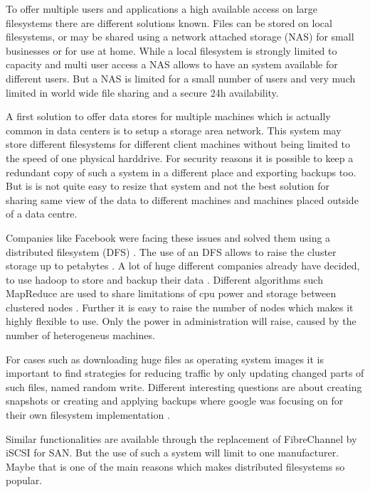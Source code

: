 To offer multiple users and applications a high available access on large filesystems there are different solutions known. 
Files can be stored on local filesystems, or may be shared using a network attached storage (NAS) for small businesses or for use at home. 
While a local filesystem is strongly limited to capacity and multi user access a NAS allows to have an system available for different users. 
But a NAS is limited for a small number of users and very much limited in world wide file sharing and a secure 24h availability.

A first solution to offer data stores for multiple machines which is actually common in data centers is to setup a storage area network. 
This system may store different filesystems for different client machines without being limited to the speed of one physical harddrive. 
For security reasons it is possible to keep a redundant copy of such a system in a different place and exporting backups too. 
But is is not quite easy to resize that system and not the best solution for sharing same view of the data to different machines and machines placed outside of a data centre.

Companies like Facebook were facing these issues and solved them using a distributed filesystem (DFS) \cite{fb-hadoop}. 
The use of an DFS allows to raise the cluster storage  up to petabytes  \cite{fb-hadoop}. 
A lot of huge different companies already have decided, to use hadoop to store and backup their data  \cite{hadoop-poweredby}. 
Different algorithms such MapReduce are used to share limitations of cpu power and storage between clustered nodes \cite{dean2008mapreduce}. 
Further it is easy to raise the number of nodes which makes it highly flexible to use. Only the power in administration will raise, caused by the number of heterogeneus machines.

For cases such as downloading huge files as operating system images it is important to find strategies for reducing traffic by only updating changed parts of such files, named random write.
Different interesting questions are about creating snapshots or creating and applying backups where google was focusing on for their own filesystem implementation \cite{ghemawat2003google}.

Similar functionalities are available through the replacement of FibreChannel by iSCSI for SAN. But the use of such a system will limit to one manufacturer. Maybe that is one of the main reasons which makes distributed filesystems so popular.

